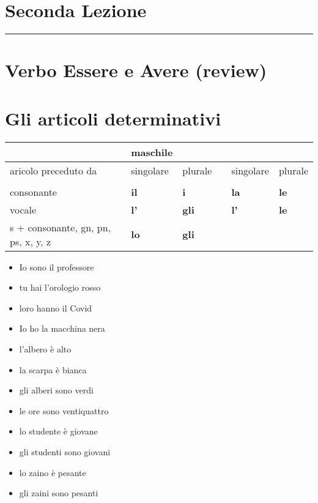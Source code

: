 \documentclass[letter,11pt]{article}
\begin{document}
\section*{\Large{Seconda Lezione}}
\noindent\rule{16cm}{1pt}

\section*{Verbo Essere e Avere (review)}

\section*{Gli articoli determinativi}


\begin{tabular}{ |p{3cm}| p{0.2cm}| p{2cm}| p{2cm}| p{0.2cm}| p{2cm}| p{2cm}| }
     &  & {\bf maschile} & & & & \\
    \hline
     aricolo preceduto da &  & singolare & plurale & & singolare & plurale \\
    \hline
    \hline
     &  &  & & & & \\ \hline
    consonante &  & {\bf il} & {\bf i} & & {\bf la}  & {\bf le} \\ \hline
    vocale & & {\bf l'} & {\bf gli} & & {\bf l'}  & {\bf le} \\ \hline
    s + consonante, gn, pn, ps, x, y, z & & {\bf lo} & {\bf gli} &   \\
    \hline
    \hline
\end{tabular}

\vskip 0.5in
\begin{multicols}{2}
\begin{itemize}
    \item Io sono il professore
    \item tu hai l'orologio rosso
    \item loro hanno il Covid
    \item Io ho la macchina nera
    \item l'albero è alto
    \item la scarpa è bianca
    \item gli alberi sono verdi
    \item le ore sono ventiquattro
    \item lo studente è giovane
    \item gli studenti sono giovani
    \item lo zaino è pesante
    \item gli zaini sono pesanti

\end{itemize}
\end{multicols}
\end{document}
